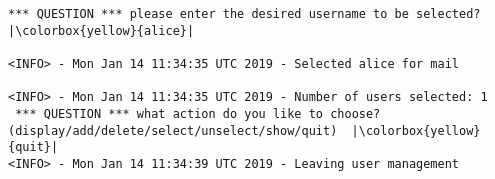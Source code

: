 \begin{lstlisting}[escapeinside=||]
 *** QUESTION *** please enter the desired username to be selected?  |\colorbox{yellow}{alice}|
                                                                                                                                                                                                                                                                                                                                              
<INFO> - Mon Jan 14 11:34:35 UTC 2019 - Selected alice for mail
                                                                                                                                                                                                                                                                                                                                              
<INFO> - Mon Jan 14 11:34:35 UTC 2019 - Number of users selected: 1
 *** QUESTION *** what action do you like to choose? (display/add/delete/select/unselect/show/quit)  |\colorbox{yellow}{quit}| 
<INFO> - Mon Jan 14 11:34:39 UTC 2019 - Leaving user management
 \end{lstlisting}
 

